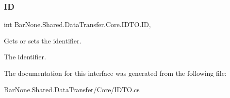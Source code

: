 \subsubsection{\texorpdfstring{ID}{ID}}
{\footnotesize\ttfamily int Bar\+None.\+Shared.\+Data\+Transfer.\+Core.\+I\+D\+T\+O.\+ID\hspace{0.3cm}{\ttfamily [get]}, {\ttfamily [set]}}



Gets or sets the identifier. 

The identifier. 

The documentation for this interface was generated from the following file\+:\begin{DoxyCompactItemize}
\item 
Bar\+None.\+Shared.\+Data\+Transfer/\+Core/I\+D\+T\+O.\+cs\end{DoxyCompactItemize}
